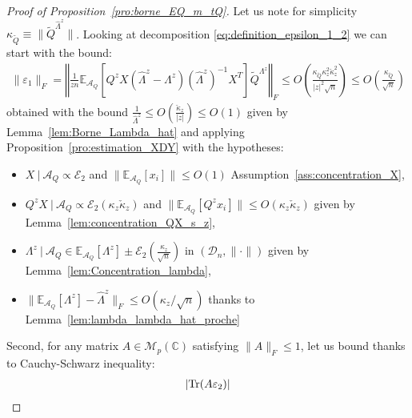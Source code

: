 \documentclass[a4papaer, titlepage]{book}
\begin{document}
 \begin{proof}[Proof of Proposition~\ref{pro:borne_EQ_m_tQ}]
 Let us note for simplicity $\kappa_{\tilde Q} \equiv \|\tilde Q^{\hat \Lambda^z}\|$.
  Looking at decomposition \eqref{eq:definition_epsilon_1_2} we can start with the bound:%
  \begin{align*}
     \|\varepsilon_1 \|_F = \left\Vert \frac{1}{zn} \mathbb{E}_{\mathcal A_Q}\left[Q^zX \left(\hat \Lambda^z - \Lambda^z\right)(\hat \Lambda^z)^{-1}X^T \right]\tilde{Q}^{\Lambda^z}\right\Vert_F \leq O \left(\frac{\kappa_ {\tilde Q} \kappa_z^2\check\kappa_z^2}{|z|^2\sqrt{n}}\right)\leq O \left(\frac{\kappa_ {\tilde Q}}{\sqrt{n}}\right)
   \end{align*}
   obtained with the bound $\frac{1}{\hat \Lambda^z} \leq O(\frac{\check \kappa_z}{|z|})\leq O(1)$ given by Lemma~\ref{lem:Borne_Lambda_hat} and applying Proposition~\ref{pro:estimation_XDY} with the hypotheses:
   \begin{itemize}
      \item $X \ | \ \mathcal A_Q \propto \mathcal E_2$ and $\|\mathbb E_{\mathcal A_Q}[x_i]\| \leq O(1)$ Assumption~\ref{ass:concentration_X},
      \item $Q^zX \ | \ \mathcal A_Q \propto \mathcal E_2(\kappa_z\check\kappa_z) $ and $\|\mathbb E_{\mathcal A_Q}[Q^zx_i]\|\leq O(\kappa_z\check\kappa_z)$ given by Lemma~\ref{lem:concentration_QX_s_z},
      \item $ \Lambda^z \ | \ \mathcal A_Q\in \mathbb E_{\mathcal A_Q}[\Lambda^z] \pm \mathcal E_2 \left(\frac{\kappa_z}{\sqrt n}\right)$ in $(\mathcal{D}_{n}, \| \cdot \|)$ given by Lemma~\ref{lem:Concentration_lambda},
      \item $\|  \mathbb E_{\mathcal A_Q}[\Lambda^z] - \hat \Lambda^z\|_F \leq O(\kappa_z/\sqrt n)$ thanks to Lemma~\ref{lem:lambda_lambda_hat_proche}
    \end{itemize}
  Second, for any matrix $A\in \mathcal{M}_p(\mathbb C)$ satisfying $\|A\|_F \leq 1$, let us bound thanks to Cauchy-Schwarz inequality:
  \begin{align*}
    \left\vert \mathbb \tr(A\varepsilon_2) \right\vert

\end{align*}
\end{proof}
\end{document}
